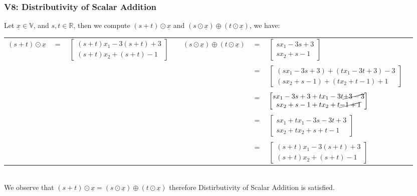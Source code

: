 \documentclass{article}
\begin{document}
\subsubsection*{V8: Distributivity of Scalar Addition}
Let $\underline{x}\in\mathbb{V}$, and $s,t\in\mathbb{R}$, then we compute $(s+t)\odot\underline{x}$ and $(s\odot\underline{x})\oplus(t\odot\underline{x})$, we have:
\begin{table}[htp]
\centering
\begin{tabular}{cclc|cclc}
  $(s+t)\odot\underline{x}$ & $=$  & $\begin{bmatrix} (s+t)x_{1}-3(s+t)+3\\(s+t)x_{2}+(s+t)-1\end{bmatrix}$  &   & $(s\odot\underline{x})\oplus(t\odot\underline{x})$  & $=$  & $\begin{bmatrix} sx_{1}-3s+3\\sx_{2}+s-1\end{bmatrix}$  &   \\
  &&&&&&&\\ 
  &   &   &   &   & $=$  & $\begin{bmatrix} (sx_{1}-3s+3)+(tx_{1}-3t+3)-3\\(sx_{2}+s-1)+(tx_{2}+t-1)+1\end{bmatrix}$  &   \\
  &&&&&&&\\ 
  &   &   &   &   & $=$  & $\begin{bmatrix} sx_{1}-3s+3+tx_{1}-3t\cancel{+3-3}\\sx_{2}+s-1+tx_{2}+t\cancel{-1+1}\end{bmatrix}$  &   \\
  &&&&&&&\\ 
  &   &   &   &   & $=$  & $\begin{bmatrix} sx_{1}+tx_{1}-3s-3t+3\\sx_{2}+tx_{2}+s+t-1\end{bmatrix}$  &   \\
  &&&&&&&\\ 
  &   &   &   &   & $=$  & $\begin{bmatrix} (s+t)x_{1}-3(s+t)+3\\(s+t)x_{2}+(s+t)-1\end{bmatrix}$  &   \\
\end{tabular}
\end{table}\\
We observe that $(s+t)\odot\underline{x}=(s\odot\underline{x})\oplus(t\odot\underline{x})$ therefore Distirbutivity of Scalar Addition is satisfied.
\end{document}
